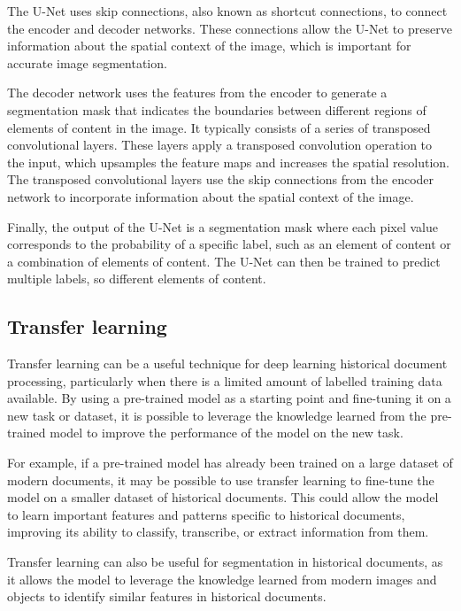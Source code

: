 \documentclass{polytech/polytech}
\numberwithin{figure}{chapter}
\begin{document}
The U-Net uses skip connections, also known as shortcut connections, to connect the encoder and decoder networks.
These connections allow the U-Net to preserve information about the spatial context of the image, which is important for accurate image segmentation.

The decoder network uses the features from the encoder to generate a segmentation mask that indicates the boundaries between different regions of elements of content in the image.
It typically consists of a series of transposed convolutional layers.
These layers apply a transposed convolution operation to the input, which upsamples the feature maps and increases the spatial resolution.
The transposed convolutional layers use the skip connections from the encoder network to incorporate information about the spatial context of the image.

Finally, the output of the U-Net is a segmentation mask where each pixel value corresponds to the probability of a specific label, such as an element of content or a combination of elements of content.
The U-Net can then be trained to predict multiple labels, so different elements of content.


\subsection{Transfer learning}

Transfer learning can be a useful technique for deep learning historical document processing, particularly when there is a limited amount of labelled training data available.
By using a pre-trained model as a starting point and fine-tuning it on a new task or dataset, it is possible to leverage the knowledge learned from the pre-trained model to improve the performance of the model on the new task.

For example, if a pre-trained model has already been trained on a large dataset of modern documents, it may be possible to use transfer learning to fine-tune the model on a smaller dataset of historical documents.
This could allow the model to learn important features and patterns specific to historical documents, improving its ability to classify, transcribe, or extract information from them.

Transfer learning can also be useful for segmentation in historical documents, as it allows the model to leverage the knowledge learned from modern images and objects to identify similar features in historical documents.
\end{document}
